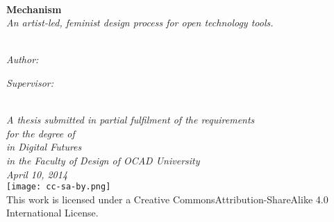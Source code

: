 \documentclass[11pt, letterpaper, oneside]{Thesis} %
\begin{document}
\begin{titlepage}
\HRule \\[0.5cm] %
{\huge \bfseries Mechanism}\\
{\large \it An artist-led, feminist design process for open technology tools.}
\\[0.4cm] %
\HRule \\[8.5cm] %

\begin{minipage}{0.4\textwidth}
\begin{flushleft} \large
\emph{Author:}\\
\href{http://www.alexleitch.com}{\authornames} %
\end{flushleft}
\end{minipage}

\begin{minipage}{0.4\textwidth}
\begin{flushleft} \large
\emph{Supervisor:} \\
\href{https://twitter.com/emmawestecott}{\supname} %
\end{flushleft}
\end{minipage}\\[0.5cm]
 
\large \textit{A thesis submitted in partial fulfilment of the requirements\\ for the degree of \degreename}\\%
\textit{in Digital Futures}\\ %
\textit{in the Faculty of Design of OCAD University}\\
\textit{April 10, 2014}\\ %

 \texttt{[image: cc-sa-by.png]}\\
 This work is licensed under a Creative Commons\newline Attribution-ShareAlike 4.0 International License.

\end{titlepage}
\setcounter{page}{2}

\end{document}

